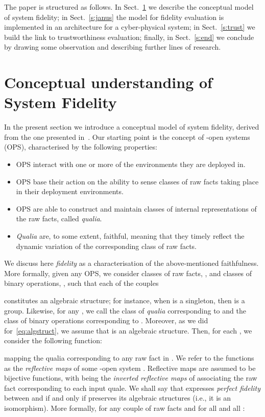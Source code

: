 \documentclass{article}
\begin{document}
The paper is structured as follows. In Sect.~\ref{s:fidel} we describe the conceptual model of system fidelity; in Sect.~\ref{s:janus} the model for fidelity evaluation is implemented in an architecture for a cyber-physical system;
in Sect.~\ref{s:trust} we build the link to trustworthiness evaluation; finally, in Sect.~\ref{s:end}
we conclude by drawing some observation and describing further lines of research.




\section{Conceptual understanding of System Fidelity}\label{s:fidel}

In the present section we introduce a conceptual model of system fidelity, derived from the one presented in~\cite{DF14a}. Our starting point is the concept of -open systems (OPS), characterised by the following properties:

\begin{itemize}
\item OPS interact with one or more of the environments they are deployed in.
\item OPS base their action on the ability to sense  classes of raw facts taking place
      in their deployment environments.
\item OPS are able to construct and maintain  classes of 
      internal representations of the raw facts, called \textit{qualia}.
\item \textit{Qualia} are, to some extent, faithful, meaning that they timely
      reflect the dynamic variation of the corresponding class of raw facts.
\end{itemize}

We discuss here \emph{fidelity\/} as a characterisation of the above-mentioned faithfulness.
More formally, given any OPS, we consider  classes of raw facts, , and 
classes of binary operations, , such that each of the couples 

constitutes an algebraic structure; for instance, when  is a singleton,
then  is a group.
Likewise, for any , we call  the class of \textit{qualia\/} corresponding to  and
 the class of binary operations corresponding to .
Moreover, as we did for~\eqref{eq:algstruct}, we assume that  is an
algebraic structure. Then, for each , we consider the following function:


mapping the qualia corresponding to any raw fact in . We refer to the  functions as the \emph{reflective maps\/} of some -open system . Reflective maps are assumed to be bijective functions, with  being the \emph{inverted reflective maps\/} of  associating the raw fact corresponding to each input quale. We shall say that  expresses \emph{perfect fidelity\/} between  and  if and only if 
preserves its algebraic structures (i.e., it is an isomorphism). More formally, for any couple of raw facts 
and for all  and all :
\end{document}
